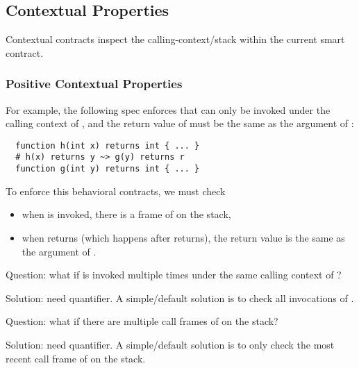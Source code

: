 

\subsection{Contextual Properties}

Contextual contracts inspect the calling-context/stack within the
current smart contract.


\subsubsection{Positive Contextual Properties}

For example, the following spec enforces that  can only be invoked
under the calling context of , and the return value of  must be
the same as the argument of :

\begin{lstlisting}
  function h(int x) returns int { ... }
  # h(x) returns y ~> g(y) returns r
  function g(int y) returns int { ... }
\end{lstlisting}

To enforce this behavioral contracts, we must check
\begin{itemize}
	\item when  is invoked, there is a frame of  on the stack,
	\item when  returns (which happens after  returns), the return value
	      is the same as the argument of .
\end{itemize}

Question: what if  is invoked multiple times under the same calling context of
?

Solution: need quantifier. A simple/default solution is to check all
invocations of .

Question: what if there are multiple call frames of  on the stack?

Solution: need quantifier. A simple/default solution is to only check
the most recent call frame of  on the stack.


